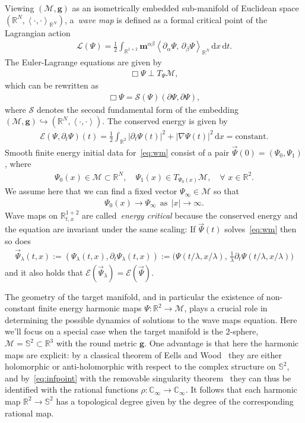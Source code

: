 \documentclass[10pt,reqno]{amsart}
\newcommand{\E}{\mathcal{E}}
\newcommand{\LL}{\mathcal{L}}
\newcommand{\M}{\mathcal{M}}
\newcommand{\C}{\mathbb{C}}
\newcommand{\R}{\mathbb{R}}
\newcommand{\Sp}{\mathbb{S}}
\newcommand{\g}{\mathbf{g}}
\newcommand{\m}{\mathbf{m}}
\newcommand{\al}{\alpha}
\newcommand{\be}{\beta}
\newcommand{\la}{\lambda}
\newcommand{\p}{\partial}
\newcommand{\na}{\nabla}
\newcommand{\ang}[1]{\left\langle{#1}\right\rangle}
\newcommand{\abs}[1]{\left\lvert{#1}\right\rvert}
\newcommand{\EQ}[1]{\begin{equation}\begin{split} #1 \end{split}\end{equation}}
\numberwithin{equation}{section}
\theoremstyle{remark}
\newcommand{\mas}{{\ \ \text{as} \ \ }}
\newcommand{\ud}{\mathrm{d}}
\newcommand{\0}{\emptyset}
\begin{document}
Viewing $(\M, \g)$ as an isometrically embedded sub-manifold of Euclidean space $(\R^N, \ang{ \cdot, \cdot}_{\R^N})$,  a~\emph{wave map} is defined as a formal critical point of the Lagrangian action
 \EQ{
\LL(\Psi)  =  \frac{1}{2} \int_{\R^{1+2}}  \m^{\al \be} \ang{ \p_\al \Psi , \,  \p_\be \Psi }_{\R^N} \,  \ud x\, \ud t.
}
The Euler-Lagrange equations are given by 
\EQ{
\Box \Psi \perp T_{\Psi} \M,
}
which can be rewritten as 
\EQ{ \label{eq:wm}
\Box \Psi = \mathcal{S}(\Psi)(\p \Psi, \p \Psi),
}
where $\mathcal{S}$ denotes the second fundamental form of the embedding $(\M, \g) \hookrightarrow (\R^N, \ang{ \cdot, \cdot}).$
The conserved energy is given by 
\EQ{ \label{eq:en1} 
\E(\Psi, \p_t \Psi)(t)  =  \frac{1}{2} \int_{\R^2}  \abs{\p_t \Psi(t)}^2  +  \abs{\na \Psi(t)}^2 \, \ud x  = \textrm{constant}.
}
Smooth finite energy initial data  for~\eqref{eq:wm} consist of a pair  $\vec \Psi(0) = (\Psi_0, \Psi_1)$, where 
\EQ{ \label{eq:data} 
\Psi_0(x) \in \M   \subset \R^N , \quad \Psi_1(x)  \in  T_{\Psi_0(x)}\M, \quad  \forall  \, \, x \in \R^2.
} 
We assume here that  we can find a fixed vector $\Psi_\infty \in \M$ so that 
\EQ{\label{eq:infpoint}
\Psi_0(x) \to \Psi_\infty \mas \abs{x} \to \infty. 
}
Wave maps on $\R^{1+2}_{t, x}$ are called~\emph{energy critical} because the conserved energy and the equation are invariant under the same scaling: If $\vec \Psi(t)$ solves~\eqref{eq:wm} then so does 
\EQ{ \label{eq:scale}
\vec \Psi_{\la}(t, x) := (\Psi_\la(t, x), \p_t \Psi_\la(t, x)) := \Big(\Psi(t/\la,  x/\la), \, \frac{1}{\la} \p_t \Psi(  t/ \la , x/ \la)\Big)
}
and it also holds that $\E(\vec \Psi_\la) = \E(\vec\Psi)$. 



The geometry of the target manifold, and in particular the existence of non-constant finite energy harmonic maps $\Psi: \R^2 \to \M$,   plays a crucial role in determining the possible dynamics of solutions to the wave maps equation. Here we'll focus on a special case when the target manifold is the $2$-sphere, $\M = \Sp^2 \subset \R^3$ with the round metric $\g$. One advantage is that here the harmonic maps are explicit: by a classical theorem of Eells and Wood~\cite{EW} they are either holomorphic or anti-holomorphic with respect to the complex structure on $\Sp^2$, and  by~\eqref{eq:infpoint} with the removable singularity theorem~\cite{SU} they can thus be identified with the rational functions $\rho: \C_{\infty} \to \C_{\infty}$.  It follows that each harmonic map $\R^2 \to \Sp^2$ has a topological degree given by the degree of the corresponding rational map. 
\end{document}
